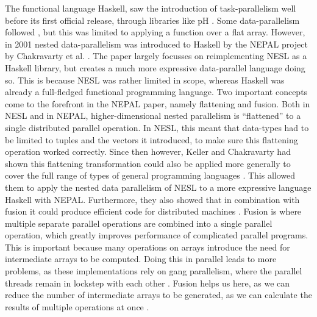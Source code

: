         The functional language Haskell, saw the introduction of task-parallelism well before its first official release, through libraries like pH \cite{maessen1995semantics}.
        Some data-parallelism followed \cite{hill1995data, herrmann1999parallelization, ellmenreich2000application}, but this was limited to applying a function over a flat array.
        However, in 2001 nested data-parallelism was introduced to Haskell by the NEPAL project by Chakravarty et al. \cite{chakravarty2001nepal}.
        The paper largely focusses on reimplementing NESL as a Haskell library, but creates a much more expressive data-parallel language doing so.
        This is because NESL was rather limited in scope, whereas Haskell was already a full-fledged functional programming language.
        Two important concepts come to the forefront in the NEPAL paper, namely flattening and fusion.
        Both in NESL and in NEPAL, higher-dimensional nested parallelism is ``flattened'' to a single distributed parallel operation.
        In NESL, this meant that data-types had to be limited to tuples and the vectors it introduced, to make sure this flattening operation worked correctly.
        Since then however, Keller and Chakravarty had shown this flattening transformation could also be applied more generally to cover the full range of types of general programming languages \cite{keller1999transformation,keller1998flattening,chakravarty2000more}.
        This allowed them to apply the nested data parallelism of NESL to a more expressive language Haskell with NEPAL.
        Furthermore, they also showed that in combination with fusion it could produce efficient code for distributed machines \cite{chakravarty2001functional}.
        Fusion is where multiple separate parallel operations are combined into a single parallel operation, which greatly improves performance of complicated parallel programs.
        This is important because many operations on arrays introduce the need for intermediate arrays to be computed.
        Doing this in parallel leads to more problems, as these implementations rely on gang parallelism, where the parallel threads remain in lockstep with each other \cite{feitelson1996packing}.
        Fusion helps us here, as we can reduce the number of intermediate arrays to be generated, as we can calculate the results of multiple operations at once \cite{keller1999distributed,chakravarty2007data}.
        
